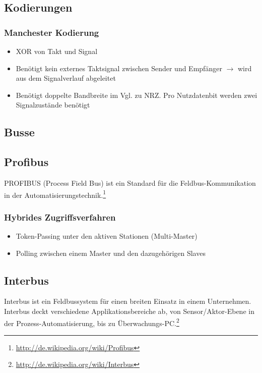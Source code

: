 \subsection{Kodierungen}

\subsubsection{Manchester Kodierung}
\begin{itemize}
	\item XOR von Takt und Signal
	\item Benötigt kein externes Taktsignal zwischen Sender und Empfänger \(\rightarrow\) wird aus dem Signalverlauf abgeleitet
	\item Benötigt doppelte Bandbreite im Vgl. zu NRZ. Pro Nutzdatenbit werden zwei Signalzustände benötigt
\end{itemize}


\subsection{Busse}

\subsection{Profibus}
PROFIBUS (Process Field Bus) ist ein Standard für die Feldbus-Kommunikation in der Automatisierungstechnik.\footnote{\url{http://de.wikipedia.org/wiki/Profibus}}

\subsubsection{Hybrides Zugriffsverfahren}
\begin{itemize}
	\item Token-Passing unter den aktiven Stationen (Multi-Master)
	\item Polling zwischen einem Master und den dazugehörigen Slaves
\end{itemize}


\subsection{Interbus}
Interbus ist ein Feldbussystem für einen breiten Einsatz in einem Unternehmen. Interbus deckt verschiedene Applikationsbereiche ab, von Sensor/Aktor-Ebene in der Prozess-Automatisierung, bis zu Überwachungs-PC.\footnote{\url{http://de.wikipedia.org/wiki/Interbus}}

